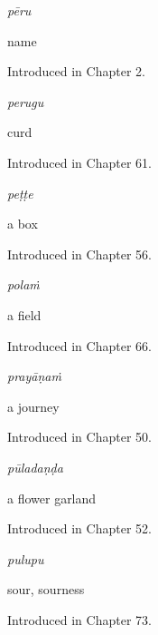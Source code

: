 \noindent\begin{minipage}[t]{\linewidth}
\raggedright
\textbf{}\enspace\emph{pēru}\par
\small name\par
\footnotesize Introduced in Chapter 2.
\end{minipage}\par\medskip

\noindent\begin{minipage}[t]{\linewidth}
\raggedright
\textbf{}\enspace\emph{perugu}\par
\small curd\par
\footnotesize Introduced in Chapter 61.
\end{minipage}\par\medskip

\noindent\begin{minipage}[t]{\linewidth}
\raggedright
\textbf{}\enspace\emph{peṭṭe}\par
\small a box\par
\footnotesize Introduced in Chapter 56.
\end{minipage}\par\medskip

\noindent\begin{minipage}[t]{\linewidth}
\raggedright
\textbf{}\enspace\emph{polaṁ}\par
\small a field\par
\footnotesize Introduced in Chapter 66.
\end{minipage}\par\medskip

\noindent\begin{minipage}[t]{\linewidth}
\raggedright
\textbf{}\enspace\emph{prayāṇaṁ}\par
\small a journey\par
\footnotesize Introduced in Chapter 50.
\end{minipage}\par\medskip

\noindent\begin{minipage}[t]{\linewidth}
\raggedright
\textbf{}\enspace\emph{pūladaṇḍa}\par
\small a flower garland\par
\footnotesize Introduced in Chapter 52.
\end{minipage}\par\medskip

\noindent\begin{minipage}[t]{\linewidth}
\raggedright
\textbf{}\enspace\emph{pulupu}\par
\small sour, sourness\par
\footnotesize Introduced in Chapter 73.
\end{minipage}\par\medskip

